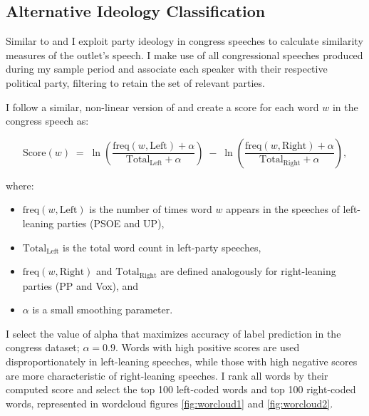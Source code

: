 \documentclass[12pt]{article}
\begin{document}
	
	
	
	\subsection*{Alternative Ideology Classification}
	
	
Similar to \cite{gentzkow2010media} and \cite{laver2003extracting} I exploit party ideology in congress speeches to calculate similarity measures of the outlet's speech. I make use of all congressional speeches produced during my sample period and associate each speaker with their respective political party, filtering to retain the set of relevant parties.

I follow a similar, non-linear version of \cite{laver2003extracting} and create a score for each word $w$ in the congress speech as: 


	
	\begin{equation}
		\text{Score}(w) \;=\; \ln \left( \frac{\mathrm{freq}(w,\text{Left}) + \alpha}{\mathrm{Total}_{\text{Left}} + \alpha} \right) \;-\; \ln \left( \frac{\mathrm{freq}(w,\text{Right}) + \alpha}{\mathrm{Total}_{\text{Right}} + \alpha} \right),
		\label{eq:log_ratio}
	\end{equation}
	
	where:
	\begin{itemize}
		\item $\mathrm{freq}(w,\text{Left})$ is the number of times word $w$ appears in the speeches of left-leaning parties (PSOE and UP),
		\item $\mathrm{Total}_{\text{Left}}$ is the total word count in left-party speeches,
		\item $\mathrm{freq}(w,\text{Right})$ and $\mathrm{Total}_{\text{Right}}$ are defined analogously for right-leaning parties (PP and Vox), and
		\item $\alpha$ is a small smoothing parameter.
		
	\end{itemize}
	
	I select the value of alpha that maximizes accuracy of label prediction in the congress dataset; $\alpha=0.9$.	
	Words with high positive scores are used disproportionately in left-leaning speeches, while those with high negative scores are more characteristic of right-leaning speeches. I rank all words by their computed score and select the top 100 left-coded words and top 100 right-coded words, represented in wordcloud figures  \ref{fig:worcloud1} and \ref{fig:worcloud2}.
	
\end{document}
